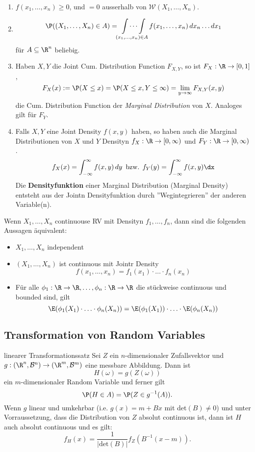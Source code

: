 \begin{enumerate}
    \item $f(x_1, \ldots, x_n) \geq 0$, und $ = 0$ ausserhalb von $\mathcal{W}(X_1, \ldots, X_n)$.
    \item 
    \begin{gather*}
        \P((X_1, \ldots, X_n) \in A) = \idotsint\limits_{(x_1, \ldots, x_n) \in A} f(x_1, \ldots, x_n) \mathop{dx_n}\ldots\mathop{dx_1}
    \end{gather*}
    für $A \subseteq \R^n$ beliebig.
    \item Haben $X, Y$ die Joint Cum. Distribution Function $F_{X,Y}$, so ist $F_X: \R \to [0,1]$,
    $$F_X(x) := \P(X \leq x) = \P(X \leq x, Y \leq \infty) = \lim_{y \to \infty}F_{X,Y}(x,y)$$
    die Cum. Distribution Function der \textit{Marginal Distribution} von $X$. Analoges gilt für $F_Y$.
    \item Falls $X,Y$ eine Joint Density $f(x,y)$ haben, so haben auch die Marginal Distributionen von $X$ und $Y$ Densityn $f_X: \R \to [0, \infty)$ und $F_Y: \R \to [0, \infty)$.
    $$f_X(x) = \int_{-\infty}^{\infty}f(x,y)\mathop{dy} \text{ bzw. } f_Y(y)=\int_{-\infty}^{\infty}f(x,y)\dx$$
    Die \textbf{Densityfunktion} einer Marginal Distribution (Marginal Density) entsteht aus der Jointn Densityfunktion durch ''Wegintegrieren'' der anderen Variable(n).
\end{enumerate}
Wenn $X_1, \ldots, X_n$ continuouse RV mit Densityn $f_1, \ldots, f_n$, dann sind die folgenden Aussagen äquivalent:
\begin{itemize}
    \item $X_1, \ldots, X_n$ independent
    \item $(X_1, \ldots, X_n)$ ist continuous mit Jointr Density $$f(x_1, \ldots, x_n) = f_1(x_1) \cdot \ldots \cdot f_n(x_n)$$
    \item Für alle $\phi_1: \R \to \R, \ldots, \phi_n: \R \to \R$ die stückweise continuous und bounded sind, gilt 
    $$\E(\phi_1(X_1)\cdot \ldots \cdot \phi_n(X_n)) = \E(\phi_1(X_1)) \cdot \ldots \cdot \E(\phi_n(X_n))$$
\end{itemize}
\subsection{Transformation von Random Variables}
\begin{subbox}{linearer Transformationssatz}
    Sei $Z$ ein $n$-dimensionaler Zufallsvektor und $g: (\R^n, \mathcal{B}^n) \to (\R^m, \mathcal{B}^m)$ eine messbare Abbildung. Dann ist
    $$H(\omega) = g(Z(\omega))$$
    ein $m$-dimensionaler Random Variable und ferner gilt
    $$\P(H \in A) = \P(Z \in g^{-1}(A)).$$
    Wenn $g$ linear und umkehrbar (i.e. $g(x) = m + Bx$ mit det$(B) \neq 0$) und unter Vorraussetzung, dass die Distribution von $Z$ absolut continuous ist, dann ist $H$ auch absolut continuous und es gilt:
    $$f_H(x)=\frac{1}{|\text{det}(B)|}f_Z(B^{-1}(x-m)).$$
\end{subbox}
